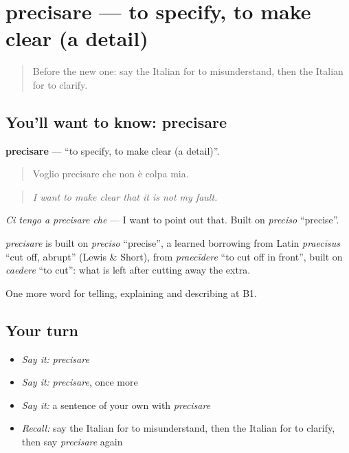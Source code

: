 \section[precisare]{precisare — to specify, to make clear (a detail)}

\label{lesson:IT-C346-precisare}



\begin{quote}
Before the new one: say the Italian for to misunderstand, then the Italian for to clarify.
\end{quote}

\subsection*{You'll want to know: precisare}
\textbf{precisare} — \textquotedblleft{}to specify, to make clear (a detail)\textquotedblright{}.

\begin{quote}
Voglio precisare che non è colpa mia.
\end{quote}

\begin{quote}
\emph{I want to make clear that it is not my fault.}
\end{quote}

\emph{Ci tengo a precisare che} — I want to point out that. Built on \emph{preciso} \textquotedblleft{}precise\textquotedblright{}.

\begin{cousinweb}
\emph{precisare} is built on \emph{preciso} \textquotedblleft{}precise\textquotedblright{}, a learned borrowing from Latin \emph{praecīsus} \textquotedblleft{}cut off, abrupt\textquotedblright{} (Lewis \& Short), from \emph{praecīdere} \textquotedblleft{}to cut off in front\textquotedblright{}, built on \emph{caedere} \textquotedblleft{}to cut\textquotedblright{}: what is left after cutting away the extra.
\end{cousinweb}

\begin{grammarlens}[title={What you've built}]
One more word for telling, explaining and describing at B1.
\end{grammarlens}

\subsection*{Your turn}
\begin{itemize}
\raggedright
  \item \emph{Say it:} \emph{precisare}
  \item \emph{Say it:} \emph{precisare}, once more
  \item \emph{Say it:} a sentence of your own with \emph{precisare}
  \item \emph{Recall:} say the Italian for to misunderstand, then the Italian for to clarify, then say \emph{precisare} again
\end{itemize}

